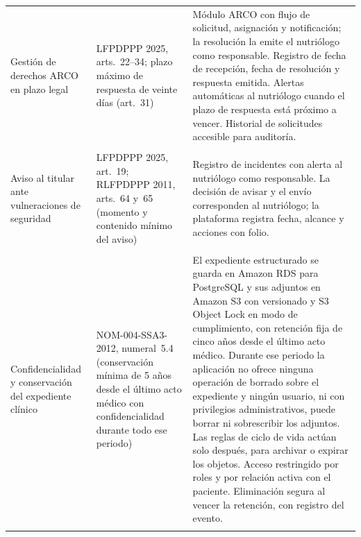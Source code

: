 \documentclass[12pt, a4paper]{article}
\begin{document}
\begin{longtable}{>{\raggedright\arraybackslash}p{2.8cm}
  >{\raggedright\arraybackslash}p{3.0cm}
  >{\raggedright\arraybackslash}p{8.5cm}}
  Gestión de derechos ARCO en plazo legal
    & LFPDPPP 2025, arts.~22--34; plazo máximo de respuesta de
      veinte días (art.~31)
        & Módulo ARCO con flujo de solicitud, asignación y
      notificación; la resolución la emite el nutriólogo como
      responsable. Registro de fecha de
      recepción, fecha de resolución y respuesta emitida.
      Alertas automáticas al nutriólogo cuando el plazo de
      respuesta está próximo a vencer. Historial de solicitudes
      accesible para auditoría. \\
      \\[4pt]
      Aviso al titular ante vulneraciones de seguridad
    & LFPDPPP 2025, art.~19; RLFPDPPP 2011, arts.~64 y~65
      (momento y contenido mínimo del aviso)
    & Registro de incidentes con alerta al nutriólogo como
      responsable. La decisión de avisar y el envío corresponden
      al nutriólogo; la plataforma registra fecha, alcance y
      acciones con folio. \\
  \\[4pt]

  Confidencialidad y conservación del expediente clínico
    & NOM-004-SSA3-2012, numeral~5.4 (conservación mínima de 5 años desde
      el último acto médico con confidencialidad durante todo
      ese periodo)
        & El expediente estructurado se guarda en Amazon RDS para
      PostgreSQL y sus adjuntos en Amazon S3 con versionado y S3
      Object Lock en modo de cumplimiento, con retención fija de
      cinco años desde el último acto médico. Durante ese periodo
      la aplicación no ofrece ninguna operación de borrado sobre el
      expediente y ningún usuario, ni con privilegios
      administrativos, puede borrar ni sobrescribir los adjuntos.
      Las reglas de ciclo de vida actúan solo después, para
      archivar o expirar los objetos. Acceso restringido por roles
      y por relación activa con el paciente. Eliminación segura al
      vencer la retención, con registro del evento. \\
  \\[4pt]


\end{longtable}
\end{document}
